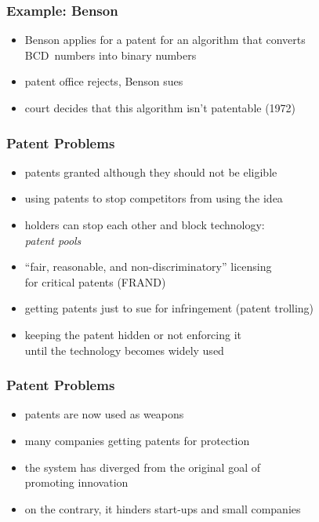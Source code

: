 \documentclass[dvipsnames]{beamer}
\theoremstyle{plain}
\begin{document}
\begin{frame}
  \frametitle{Example: Benson}

  \begin{itemize}
    \item Benson applies for a patent for an algorithm that converts\\
      BCD~numbers into binary numbers
    \item patent office rejects, Benson sues
    \item court decides that this algorithm isn't patentable (1972)
  \end{itemize}
\end{frame}

\begin{frame}
  \frametitle{Patent Problems}

  \begin{itemize}
    \item patents granted although they should not be eligible

    \medskip
    \item using patents to stop competitors from using the idea
    \item holders can stop each other and block technology:\\
      \emph{patent pools}
    \item ``fair, reasonable, and non-discriminatory'' licensing\\
      for critical patents (FRAND)

    \medskip
    \item getting patents just to sue for infringement (patent trolling)

    \medskip
    \item keeping the patent hidden or not enforcing it\\
      until the technology becomes widely used
  \end{itemize}
\end{frame}

\begin{frame}
  \frametitle{Patent Problems}

  \begin{itemize}
    \item patents are now used as weapons
    \item many companies getting patents for protection

    \medskip
    \item the system has diverged from the original goal of\\
      promoting innovation
    \item on the contrary, it hinders start-ups and small companies
  \end{itemize}
\end{frame}
\end{document}

